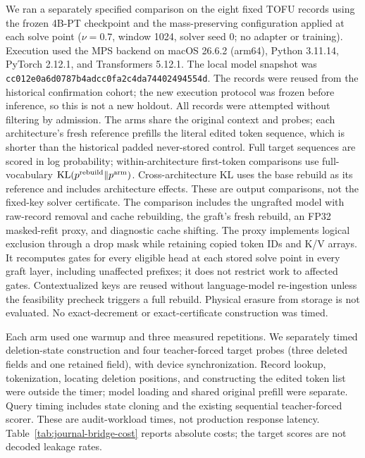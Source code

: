 We ran a separately specified comparison on the eight fixed TOFU records
using the frozen 4B-PT checkpoint and the mass-preserving configuration applied at each solve point ($\nu=0.7$, window 1024, solver seed 0; no adapter or training).
Execution used the MPS backend on macOS 26.6.2 (arm64), Python 3.11.14,
PyTorch 2.12.1, and Transformers 5.12.1. The local model snapshot was
\texttt{cc012e0a6d}\allowbreak\texttt{0787b4adcc}\allowbreak\texttt{0fa2c4da74}\allowbreak\texttt{402494554d}.
The records were reused from the historical confirmation cohort; the new
execution protocol was frozen before inference, so this is not a new holdout.
All records were attempted without filtering by admission. The arms share
the original context and probes; each architecture's fresh reference
prefills the literal edited token sequence, which is shorter than the
historical padded never-stored control. Full target sequences are scored in log probability; within-architecture
first-token comparisons use full-vocabulary $\mathrm{KL}(p^{\rm rebuild}\Vert
p^{\rm arm})$. Cross-architecture KL uses the base rebuild as its reference
and includes architecture effects. These are output comparisons, not the
fixed-key solver certificate. The comparison includes the
ungrafted model with raw-record removal and cache rebuilding, the graft's
fresh rebuild, an FP32 masked-refit proxy, and diagnostic cache shifting.
The proxy implements logical exclusion through a drop mask while retaining
copied token IDs and K/V arrays. It recomputes gates for every eligible head at each stored solve point in every graft layer, including unaffected prefixes; it
does not restrict work to affected gates. Contextualized keys are reused
without language-model re-ingestion unless the feasibility precheck
triggers a full rebuild. Physical erasure from storage is not evaluated.
No exact-decrement or exact-certificate construction was timed.

Each arm used one warmup and three measured repetitions. We separately
timed deletion-state construction and four teacher-forced target probes
(three deleted fields and one retained field), with device synchronization.
Record lookup, tokenization, locating deletion positions, and constructing
the edited token list were outside the timer; model loading and shared
original prefill were separate. Query timing includes state cloning and
the existing sequential teacher-forced scorer. These are audit-workload
times, not production response latency. Table~\ref{tab:journal-bridge-cost}
reports absolute costs; the target scores are not decoded leakage rates.

